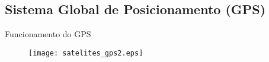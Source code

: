 
\subsection*{Sistema Global de Posicionamento (GPS)}
\begin{frame}{Funcionamento do GPS \cite{kaplan2005understanding}}
%	
	\begin{figure}[H]
		\texttt{[image: satelites\_gps2.eps]} 
	\end{figure}
\end{frame}


